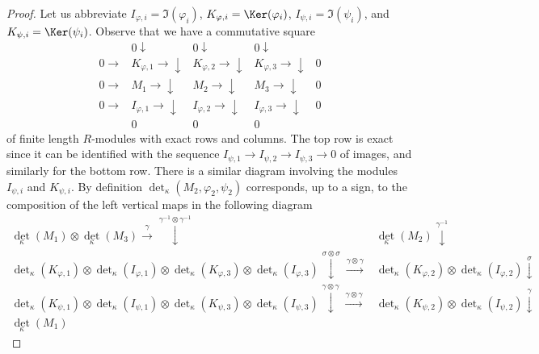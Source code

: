 \begin{proof}

Let us abbreviate
$I_{\varphi, i} = \Im(\varphi_i)$,
$K_{\varphi, i} = \Ker(\varphi_i)$,
$I_{\psi, i} = \Im(\psi_i)$, and
$K_{\psi, i} = \Ker(\psi_i)$.
Observe that we have a commutative square
$$
\begin{array}{ccccc} & 0 \downarrow & 0 \downarrow & 0 \downarrow &  \\ 0 \longrightarrow & K_{\varphi, 1} \longrightarrow\downarrow & K_{\varphi, 2} \longrightarrow\downarrow & K_{\varphi, 3} \longrightarrow\downarrow & 0 \\ 0 \longrightarrow & M_1 \longrightarrow\downarrow & M_2 \longrightarrow\downarrow & M_3 \longrightarrow\downarrow & 0 \\ 0 \longrightarrow & I_{\varphi, 1} \longrightarrow\downarrow & I_{\varphi, 2} \longrightarrow\downarrow & I_{\varphi, 3} \longrightarrow\downarrow & 0 \\  & 0 & 0 & 0 & \end{array}
$$
of finite length $R$-modules with exact rows and columns.
The top row is exact since it can be identified with the
sequence $I_{\psi, 1} \to I_{\psi, 2} \to I_{\psi, 3} \to 0$
of images, and similarly for the bottom row. There is a similar diagram
involving the modules $I_{\psi, i}$ and $K_{\psi, i}$.
By definition $\det_\kappa(M_2, \varphi_2, \psi_2)$
corresponds, up to a sign, to the composition of the left vertical maps
in the following diagram
$$
\begin{array}{cc}\det_\kappa(M_1) \otimes
\det_\kappa(M_3) \overset{\gamma}{\longrightarrow}\overset{\gamma^{-1} \otimes \gamma^{-1}}{\downarrow} & \det_\kappa(M_2)
\overset{\gamma^{-1}}{\downarrow} \\ \det\nolimits_\kappa(K_{\varphi, 1})
\otimes
\det\nolimits_\kappa(I_{\varphi, 1})
\otimes
\det\nolimits_\kappa(K_{\varphi, 3})
\otimes
\det\nolimits_\kappa(I_{\varphi, 3})
\overset{\sigma \otimes \sigma}{\downarrow}\overset{\gamma \otimes \gamma}{\longrightarrow} & \det\nolimits_\kappa(K_{\varphi, 2})
\otimes
\det\nolimits_\kappa(I_{\varphi, 2})
\overset{\sigma}{\downarrow} \\ \det\nolimits_\kappa(K_{\psi, 1})
\otimes
\det\nolimits_\kappa(I_{\psi, 1})
\otimes
\det\nolimits_\kappa(K_{\psi, 3})
\otimes
\det\nolimits_\kappa(I_{\psi, 3})
\overset{\gamma \otimes \gamma}{\downarrow}\overset{\gamma \otimes \gamma}{\longrightarrow} & \det\nolimits_\kappa(K_{\psi, 2})
\otimes
\det\nolimits_\kappa(I_{\psi, 2})
\overset{\gamma}{\downarrow} \\ \det_\kappa(M_1)

\end{array}$$
\end{proof}
